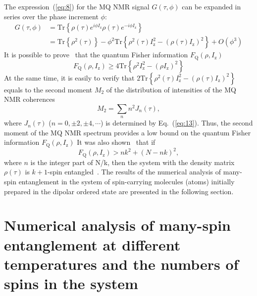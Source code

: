 \documentclass[review]{elsarticle}
\begin{document}
The expression~(\ref{eq:8}) for the MQ NMR signal $G(\tau,\phi)$ can be expanded in series over the phase increment $\phi$:
%
\begin{equation}
    \begin{split}
        \label{eq:17}
        G(\tau,\phi)  
        & = \mathrm{Tr} \left\{ 
            \rho(\tau) e^{i \phi I_\mathrm{z} }
            \rho(\tau) e^{-i\phi I_\mathrm{z}}
        \right\}  \\
        & = \mathrm{Tr} \left\{ \rho^2(\tau) \right\} 
        - \phi^2 \mathrm{Tr} \left\{ 
            \rho^2(\tau) I^2_\mathrm{z} 
            - (\rho(\tau) I_\mathrm{z})^2
        \right\} 
        + O(\phi^3)
    \end{split}
\end{equation}
%
It is possible to prove~\cite{Girolami_2017} that the quantum Fisher information $F_\mathrm{Q}(\rho,I_\mathrm{z})$~\cite{Helstrom_1969}
%
\begin{equation}
    \label{eq:18}
    F_\mathrm{Q}(\rho,I_\mathrm{z}) \geq 4 \mathrm{Tr} \left\{ \rho^2 I^2_\mathrm{z} - (\rho I_\mathrm{z})^2 \right\}
\end{equation}
%
At the same time, it is easily to verify that $2 \mathrm{Tr} \left\{ \rho^2(\tau) I_\mathrm{z}^2 - \left( \rho(\tau) I_\mathrm{z} \right)^2 \right\}$ equals to the second moment $M_2$ of the distribution of intensities of the MQ NMR coherences~\cite{Khitrin_1997}
%
\begin{equation}
    \label{eq:19}
    M_2 = \sum_{n} n^2 J_n (\tau) ,
\end{equation}
%
where $J_n(\tau)$ ($n=0,\pm 2, \pm 4, \cdots$) is determined by Eq.~(\ref{eq:13}).
Thus, the second moment of the MQ NMR spectrum provides a low bound on the quantum Fisher information $F_\mathrm{Q}(\rho,I_\mathrm{z})$
It was also shown~\cite{T_th_2014,Pezz__2018} that if
%
\begin{equation}
    \label{eq:20}
    F_\mathrm{Q} (\rho,I_\mathrm{z}) > n k^2 + (N - n k)^2,
\end{equation}
%
where $n$ is the integer part of {N/k}, then the system with the density matrix $\rho(\tau)$ is $k+1$-spin entangled~\cite{Pezz__2009,Hyllus_2012,T_th_2012}.
The results of the numerical analysis of many-spin entanglement in the system of spin-carrying molecules (atoms) initially prepared in the dipolar ordered state are presented in the following section.



\section{Numerical analysis of many-spin entanglement at different temperatures and the numbers of spins in the system}
\label{sec:5}
\end{document}
